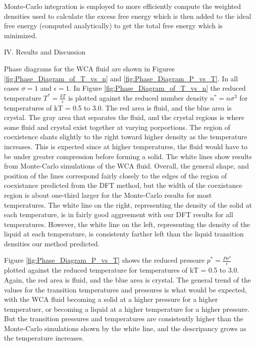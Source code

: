 \documentclass[12pt]{article}
\begin{document}
Monte-Carlo integration is employed to more efficiently 
compute the weighted densities used to calculate the excess free energy which is then 
added to the ideal free energy (computed analytically) to get the total free energy 
which is minimized. 

\newpage

\noindent IV. Results and Discussion

Phase diagrams for the WCA fluid are shown in Figures \ref{fig:Phase_Diagram_of_T_vs_n} 
and \ref{fig:Phase_Diagram_P_vs_T}. In all cases $\sigma=1$ and $\epsilon=1$. 
In Figure \ref{fig:Phase_Diagram_of_T_vs_n} the reduced temperature $T^*=\frac{kT}{\epsilon}$ 
is plotted against the reduced number density $n^*=n\sigma^3$ for temperatures of kT = 0.5 to 3.0. 
The red area is fluid, and the blue area is crystal. The gray area that separates the fluid, 
and the crystal regions is where some fluid and crystal exist together at varying porportions. 
The region of coexistence slants slightly to the right toward higher density as the temperature 
increases. This is expected since at higher temperatures, the fluid would have to be under 
greater compression before forming a solid. The white lines show results from Monte-Carlo 
simulations of the WCA fluid. Overall, the general shape, and position of the lines correspond
fairly closely to the edges of the region of coexistance predicted from the DFT method, 
but the width of the coexistance region is about one-third larger for the Monte-Carlo results 
for most temperatures. The white line on the right, representing the density of the solid at 
each temperature, is in fairly good aggreement with our DFT results for all temperatures. 
However, the white line on the left, representing the density of the liquid at each temperature, 
is consistenty farther left than the liquid transition densities our method predicted.

Figure \ref{fig:Phase_Diagram_P_vs_T} shows the reduced pressure $p^*=\frac{P\sigma^3}{\epsilon}$ 
plotted against the reduced temperature for temperatures of kT = 0.5 to 3.0. Again, the red area 
is fluid, and the blue area is crystal. The general trend of the values for the transition 
temperatures and pressures is what would be expected, with the WCA fluid becoming a solid at
a higher pressure for a higher temperatuer, or becoming a liquid at a higher temperature 
for a higher pressure. But the transition pressures and temperatures are consistently higher 
than the Monte-Carlo simulations shown by the white line, and the descripancy grows as 
the temperature increases.
\end{document}
